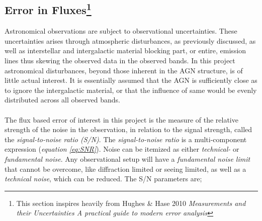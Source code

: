 \documentclass[a4paper, 12pt, twoside]{article}
\begin{document}
\subsection[Error in Fluxes]{Error in Fluxes\footnote{This section inspires heavily from Hughes \& Hase 2010 \emph{Measurements and their Uncertainties A practical guide to modern error analysis}\cite{Hughes2010}}}
Astronomical observations are subject to observational uncertainties. These uncertainties arises through atmospheric disturbances, as previously discussed, as well as interstellar and intergalactic material blocking part, or entire, emission lines thus skewing the observed data in the observed bands. In this project astronomical disturbances, beyond those inherent in the AGN structure, is of little actual interest. It is essentially assumed that the AGN is sufficiently close as to ignore the intergalactic material, or that the influence of same would be evenly distributed across all observed bands. \\
\\
The flux based error of interest in this project is the measure of the relative strength of the noise in the observation, in relation to the signal strength, called the \emph{signal-to-noise ratio (S/N)}. The \emph{signal-to-noise ratio} is a multi-component expression (\emph{equation \ref{eq:SNR}}). Noise can be itemized as either \emph{technical-} or \emph{fundamental noise}. Any observational setup will have a \emph{fundamental noise limit} that cannot be overcome, like diffraction limited or seeing limited, as well as a \emph{technical noise}, which can be reduced. The S/N parameters are\cite{SNR};
\end{document}
